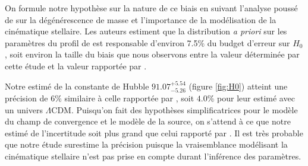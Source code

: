 \documentclass[times,10pt,twocolumn]{article}
\begin{document}
On formule notre hypothèse sur la nature de ce biais en suivant l'analyse poussé de 
\citet{Birrer2016} sur la dégénérescence de masse et l'importance de la modélisation 
de la cinématique stellaire. Les auteurs estiment que la distribution \textit{a priori} 
sur les paramètres du profil de \citet{Hernquist1990} est responsable d'environ 
7.5\% du budget d'erreur sur $H_0$, soit environ la taille du biais que nous observons 
entre la valeur déterminée par cette étude et la valeur rapportée par 
\citet{Suyu2013}.

Notre estimé de la constante de Hubble $91.07^{+5.54}_{-5.26}$ (figure \ref{fig:H0})
atteint une précision de $6\%$ similaire à celle rapportée 
par \citet{Suyu2013}, soit $4.0\%$ pour leur estimé avec un univers $\Lambda$CDM. Puisqu'on 
fait des hypothèses simplificatrices pour le modèle du champ de convergence et le 
modèle de la source, on s'attend à ce que notre estimé de l'incertitude soit 
plus grand que celui rapporté par \citet{Suyu2013}. Il est très probable 
que notre étude surestime la précision puisque la vraisemblance modélisant la cinématique 
stellaire n'est pas prise en compte durant l'inférence des paramètres.

\end{document}
